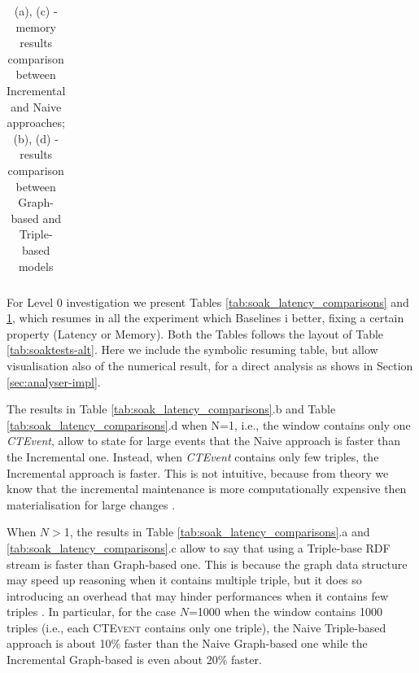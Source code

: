 \begin{table}[htbp]
{\begin{tabular}{l | ccccc}
		\hline %
	 	\end{tabular}
	}
	\caption{(a), (c) - memory results comparison between Incremental and Naive approaches; (b), (d) - results comparison between Graph-based and Triple-based models}
	\label{tab:soak_memory_comparisons}	
\end{table}

For Level 0 investigation we present Tables \ref{tab:soak_latency_comparisons} and \ref{tab:soak_memory_comparisons}, which resumes in all the experiment which Baselines i better, fixing a certain property (Latency or Memory). Both the Tables follows the layout of Table \ref{tab:soaktests-alt}. Here we include the symbolic resuming table, but \name allow visualisation also of the numerical result, for a direct analysis as shows in Section \ref{sec:analyser-impl}.

The results in Table \ref{tab:soak_latency_comparisons}.b and Table \ref{tab:soak_latency_comparisons}.d when N=1, i.e., the window contains only one \textit{CTEvent},  allow to state for large events that the Naive approach is faster than the Incremental one. Instead, when \textit{CTEvent} contains only few triples, the Incremental approach is faster. This is not intuitive, because from theory we know that the incremental maintenance is more computationally expensive then materialisation for large changes \cite{DellAglio2014,DBLP:conf/cikm/RenP11,DBLP:conf/semweb/UrbaniMJHB13}.

When $N>$1, the results in Table \ref{tab:soak_latency_comparisons}.a and \ref{tab:soak_latency_comparisons}.c allow to say that using a Triple-base RDF stream is faster than Graph-based one. This is because the graph data structure may speed up reasoning when it contains multiple triple, but it does so introducing an overhead that may hinder performances when it contains few triples \cite{DBLP:conf/semweb/BalduiniVDTPC13}. In particular, for the case $N$=1000 when the window contains 1000 triples (i.e., each \textsc{CTEvent} contains only one triple),  the Naive Triple-based approach is about 10\% faster  than the Naive Graph-based one while the Incremental Graph-based is even about 20\% faster.

